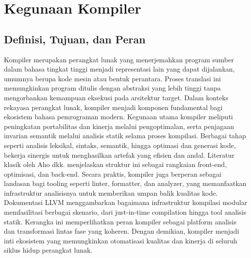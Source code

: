 \documentclass[../main.tex]{subfiles}
\begin{document}
\chapter{Kegunaan Kompiler}
\label{ch:kegunaan-kompiler}

\section{Definisi, Tujuan, dan Peran}
Kompiler merupakan perangkat lunak yang menerjemahkan program sumber dalam bahasa tingkat tinggi menjadi representasi lain yang dapat dijalankan, umumnya berupa kode mesin atau bentuk perantara. Proses translasi ini memungkinkan program ditulis dengan abstraksi yang lebih tinggi tanpa mengorbankan kemampuan eksekusi pada arsitektur target. Dalam konteks rekayasa perangkat lunak, kompiler menjadi komponen fundamental bagi ekosistem bahasa pemrograman modern.
Kegunaan utama kompiler meliputi peningkatan portabilitas dan kinerja melalui pengoptimalan, serta penjagaan invarian semantik melalui analisis statik selama proses kompilasi. Berbagai tahap seperti analisis leksikal, sintaks, semantik, hingga optimasi dan generasi kode, bekerja sinergis untuk menghasilkan artefak yang efisien dan andal. Literatur klasik oleh Aho dkk. menjelaskan struktur ini sebagai rangkaian front-end, optimisasi, dan back-end.\cite{aho-dragon-book-2006}
Secara praktis, kompiler juga berperan sebagai landasan bagi tooling seperti linter, formatter, dan analyzer, yang memanfaatkan infrastruktur analisisnya untuk memberikan umpan balik kualitas kode. Dokumentasi LLVM menggambarkan bagaimana infrastruktur kompilasi modular memfasilitasi berbagai skenario, dari just-in-time compilation hingga tool analisis statik.\cite{llvm-langref} Kerangka ini memperlihatkan peran kompiler sebagai platform analisis dan transformasi lintas fase yang koheren. Dengan demikian, kompiler menjadi inti ekosistem yang memungkinkan otomatisasi kualitas dan kinerja di seluruh siklus hidup perangkat lunak.
\end{document}
